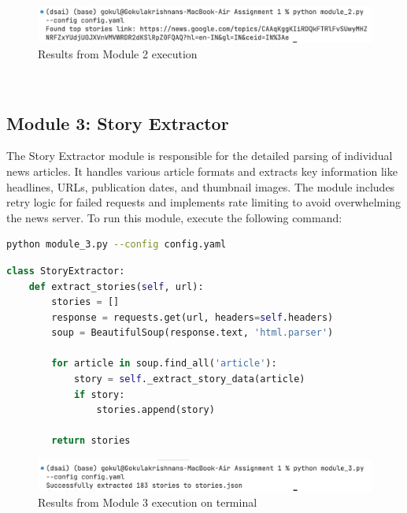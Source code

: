 \documentclass{article}
\begin{document}
\begin{figure}[H]
    \centering
    \includegraphics[width=\textwidth]{report/module_2 results.png}
    \caption{Results from Module 2 execution}
    \label{fig:module2-results}
\end{figure}

\\

\subsection{Module 3: Story Extractor}
The Story Extractor module is responsible for the detailed parsing of individual news articles. It handles various article formats and extracts key information like headlines, URLs, publication dates, and thumbnail images. The module includes retry logic for failed requests and implements rate limiting to avoid overwhelming the news server.
To run this module, execute the following command:
\begin{lstlisting}[language=bash]
python module_3.py --config config.yaml
\end{lstlisting}

\begin{lstlisting}[language=Python]
class StoryExtractor:
    def extract_stories(self, url):
        stories = []
        response = requests.get(url, headers=self.headers)
        soup = BeautifulSoup(response.text, 'html.parser')
        
        for article in soup.find_all('article'):
            story = self._extract_story_data(article)
            if story:
                stories.append(story)
        
        return stories
\end{lstlisting}

\begin{figure}[H]
    \centering
    \includegraphics[width=\textwidth]{report/module_3 results_1.png}
    \caption{Results from Module 3 execution on terminal}
    \label{fig:module3-results-1}
\end{figure}
\end{document}
